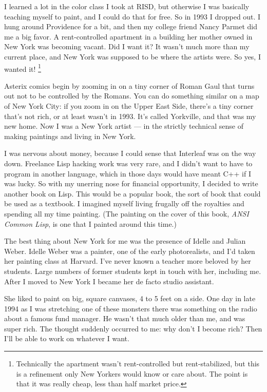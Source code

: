 I learned a lot in the color class I took at RISD, but otherwise I was
basically teaching myself to paint, and I could do that for free. So in
1993 I dropped out. I hung around Providence for a bit, and then my
college friend Nancy Parmet did me a big favor. A rent-controlled
apartment in a building her mother owned in New York was becoming
vacant. Did I want it? It wasn't much more than my current place, and
New York was supposed to be where the artists were. So yes, I wanted it!
\footnote{Technically the apartment wasn't rent-controlled but
rent-stabilized, but this is a refinement only New Yorkers would know or
care about. The point is that it was really cheap, less than half market
price.}

Asterix comics begin by zooming in on a tiny corner of Roman Gaul that
turns out not to be controlled by the Romans. You can do something
similar on a map of New York City: if you zoom in on the Upper East
Side, there's a tiny corner that's not rich, or at least wasn't in 1993.
It's called Yorkville, and that was my new home. Now I was a New York
artist --- in the strictly technical sense of making paintings and
living in New York.

I was nervous about money, because I could sense that Interleaf was on
the way down. Freelance Lisp hacking work was very rare, and I didn't
want to have to program in another language, which in those days would
have meant C++ if I was lucky. So with my unerring nose for financial
opportunity, I decided to write another book on Lisp. This would be a
popular book, the sort of book that could be used as a textbook. I
imagined myself living frugally off the royalties and spending all my
time painting. (The painting on the cover of this book, \emph{ANSI
Common Lisp}, is one that I painted around this time.)

The best thing about New York for me was the presence of Idelle and
Julian Weber. Idelle Weber was a painter, one of the early
photorealists, and I'd taken her painting class at Harvard. I've never
known a teacher more beloved by her students. Large numbers of former
students kept in touch with her, including me. After I moved to New York
I became her de facto studio assistant.

She liked to paint on big, square canvases, 4 to 5 feet on a side. One
day in late 1994 as I was stretching one of these monsters there was
something on the radio about a famous fund manager. He wasn't that much
older than me, and was super rich. The thought suddenly occurred to me:
why don't I become rich? Then I'll be able to work on whatever I want.

